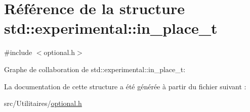 \hypertarget{structstd_1_1experimental_1_1in__place__t}{}\section{Référence de la structure std\+:\+:experimental\+:\+:in\+\_\+place\+\_\+t}
\label{structstd_1_1experimental_1_1in__place__t}


{\ttfamily \#include $<$optional.\+h$>$}



Graphe de collaboration de std\+:\+:experimental\+:\+:in\+\_\+place\+\_\+t\+:


La documentation de cette structure a été générée à partir du fichier suivant \+:\begin{DoxyCompactItemize}
\item 
src/\+Utilitaires/\hyperlink{optional_8h}{optional.\+h}\end{DoxyCompactItemize}
